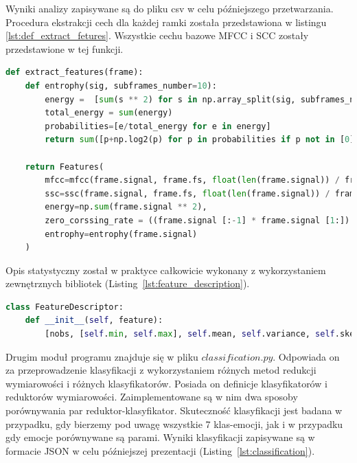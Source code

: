 \documentclass[a4paper,12pt,twoside,openany]{report}
\newcommand{\Lst}[1]{(Listing~\ref{#1})}
\begin{document}
Wyniki analizy zapisywane są do pliku csv w celu późniejszego przetwarzania.
Procedura ekstrakcji cech dla każdej ramki została przedstawiona w listingu \ref{lst:def_extract_fetures}.
Wszystkie cechu bazowe MFCC i SCC zostały przedstawione w tej funkcji.

\begin{lstlisting}[language=python,caption={Ekstrakcja cech wypowiedzi},label={lst:def_extract_fetures}]
def extract_features(frame):
    def entrophy(sig, subframes_number=10):
        energy =  [sum(s ** 2) for s in np.array_split(sig, subframes_number)]
        total_energy = sum(energy)
        probabilities=[e/total_energy for e in energy]
        return sum([p+np.log2(p) for p in probabilities if p not in [0]])

    return Features(
        mfcc=mfcc(frame.signal, frame.fs, float(len(frame.signal)) / frame.fs, winfunc=np.hamming)[0],
        ssc=ssc(frame.signal, frame.fs, float(len(frame.signal)) / frame.fs, winfunc=np.hamming)[0],
        energy=np.sum(frame.signal ** 2),
        zero_corssing_rate = ((frame.signal [:-1] * frame.signal [1:]) < 0).sum(),
        entrophy=entrophy(frame.signal)
    )
\end{lstlisting}

Opis statystyczny został w praktyce całkowicie wykonany z wykorzystaniem zewnętrznych bibliotek \Lst{lst:feature_description}. 

\begin{lstlisting}[language=python,caption={Opis statystyczny cech},label={lst:feature_description}]
class FeatureDescriptor:
    def __init__(self, feature):
        [nobs, [self.min, self.max], self.mean, self.variance, self.skewness, self.kurtosis] = stats.describe(feature)
\end{lstlisting}

Drugim moduł programu znajduje się w pliku $classification.py$.
Odpowiada on za przeprowadzenie klasyfikacji z wykorzystaniem różnych metod redukcji wymiarowości i różnych klasyfikatorów.
Posiada on definicje klasyfikatorów i reduktorów wymiarowości. 
Zaimplementowane są w nim dwa sposoby porównywania par reduktor-klasyfikator.
Skuteczność klasyfikacji jest badana w przypadku, gdy bierzemy pod uwagę wszystkie 7 klas-emocji, jak i w przypadku gdy emocje porównywane są parami.
Wyniki klasyfikacji zapisywane są w formacie JSON w celu późniejszej prezentacji \Lst{lst:classification}.
\end{document}
